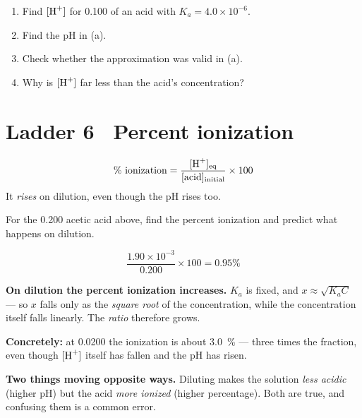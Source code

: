\documentclass{apchem-worksheet}
\begin{document}
\begin{yourturn}
\begin{enumerate}[leftmargin=*,itemsep=0.5em]
  \item Find $[\ce{H+}]$ for \SI{0.100}{\Molar} of an acid with
        $K_a = 4.0\times10^{-6}$. \workspace[1.8cm]
  \item Find the pH in (a). \workspace[1.4cm]
  \item Check whether the approximation was valid in (a).
        \workspace[1.6cm]
  \item Why is $[\ce{H+}]$ far less than the acid's concentration?
        \workspace[1.8cm]
\end{enumerate}
\end{yourturn}

\section*{\sffamily Ladder 6 \textbullet\ Percent ionization}

\[ \%\text{ ionization} = \frac{[\ce{H+}]_{\text{eq}}}
   {[\text{acid}]_{\text{initial}}} \times 100 \]
It \emph{rises} on dilution, even though the pH rises too.

\begin{workedexample}
For the \SI{0.200}{\Molar} acetic acid above, find the percent ionization
and predict what happens on dilution.

\[ \frac{1.90\times10^{-3}}{0.200}\times100 = \mathbf{0.95\%} \]

\textbf{On dilution the percent ionization increases.} $K_a$ is fixed, and
$x \approx \sqrt{K_a C}$ --- so $x$ falls only as the \emph{square root}
of the concentration, while the concentration itself falls linearly. The
\emph{ratio} therefore grows.

\textbf{Concretely:} at \SI{0.0200}{\Molar} the ionization is about
\SI{3.0}{\percent} --- three times the fraction, even though $[\ce{H+}]$
itself has fallen and the pH has risen.

\textbf{Two things moving opposite ways.} Diluting makes the solution
\emph{less acidic} (higher pH) but the acid \emph{more ionized} (higher
percentage). Both are true, and confusing them is a common error.
\end{workedexample}
\end{document}

